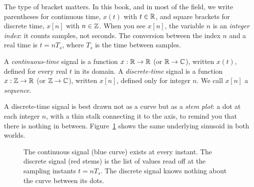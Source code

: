 \begin{focusbox}
The type of bracket matters. In this book, and in most of the field, we write
parentheses for continuous time, $x(t)$ with $t \in \mathbb{R}$, and square brackets for
discrete time, $x[n]$ with $n \in \mathbb{Z}$. When you see $x[n]$, the variable $n$ is an
\emph{integer index}: it counts samples, not seconds. The conversion between the
index $n$ and a real time is $t = n T_s$, where $T_s$ is the time between samples.
\end{focusbox}

\begin{definition}
\label{ch02:defn-ct-dt}
A \emph{continuous-time} signal is a function $x : \mathbb{R} \to \mathbb{R}$ (or $\mathbb{R} \to \mathbb{C}$),
written $x(t)$, defined for every real $t$ in its domain.
A \emph{discrete-time} signal is a function $x : \mathbb{Z} \to \mathbb{R}$ (or $\mathbb{Z} \to \mathbb{C}$),
written $x[n]$, defined only for integer $n$. We call $x[n]$ a \emph{sequence}.
\end{definition}

A discrete-time signal is best drawn not as a curve but as a \emph{stem plot}: a
dot at each integer $n$, with a thin stalk connecting it to the axis, to remind
you that there is nothing in between. Figure~\ref{ch02:fig-ct-vs-dt} shows the
same underlying sinusoid in both worlds.

\begin{figure}[h]
\centering
{}
\caption{The continuous signal (blue curve) exists at every instant. The discrete
signal (red stems) is the list of values read off at the sampling instants
$t = nT_s$. The discrete signal knows nothing about the curve between its dots.}
\label{ch02:fig-ct-vs-dt}
\end{figure}

